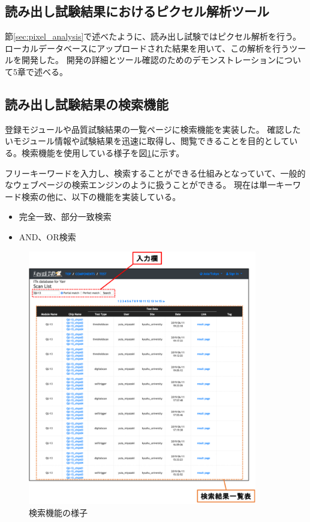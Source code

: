 
\newpage
\subsection{読み出し試験結果におけるピクセル解析ツール}
節\ref{sec:pixel_analysis}で述べたように、読み出し試験ではピクセル解析を行う。
ローカルデータベースにアップロードされた結果を用いて、この解析を行うツールを開発した。
開発の詳細とツール確認のためのデモンストレーションについて5章で述べる。


\subsection{読み出し試験結果の検索機能}
登録モジュールや品質試験結果の一覧ページに検索機能を実装した。
確認したいモジュール情報や試験結果を迅速に取得し、閲覧できることを目的としている。検索機能を使用している様子を図\ref{webapp_search_function}に示す。

フリーキーワードを入力し、検索することができる仕組みとなっていて、一般的なウェブページの検索エンジンのように扱うことができる。
現在は単一キーワード検索の他に、以下の機能を実装している。
\begin{itemize}
  \item 完全一致、部分一致検索
  \item AND、OR検索
\end{itemize}

\begin{figure}[bpt]\centering
\includegraphics[width=10cm]{webapp_search_function}
\caption[検索機能の様子]{検索機能の様子}
\label{webapp_search_function}
\end{figure}

